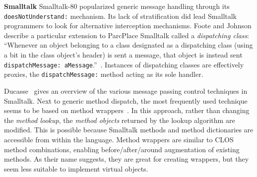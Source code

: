\documentclass{acm_proc_article-sp}
\begin{document}
\textbf{Smalltalk} Smalltalk-80 popularized generic message handling through its \texttt{doesNotUnderstand:} mechanism. Its lack of stratification did lead Smalltalk programmers to look for alternative interception mechanisms. Foote and Johnson describe a particular extension to ParcPlace Smalltalk called a \emph{dispatching class}: ``Whenever an object belonging to a class designated as a dispatching class (using a bit in the class object's header) is sent a message, that object is instead sent \texttt{dispatchMessage: aMessage}.''~\cite{foot_johnson_reflection_in_st80}. Instances of dispatching classes are effectively proxies, the \texttt{dispatchMessage:} method acting as its sole handler.

Ducasse~\cite{ducasse} gives an overview of the various message passing control techniques in Smalltalk. Next to generic method dispatch, the most frequently used technique seems to be based on method wrappers~\cite{brant}. In this approach, rather than changing the \emph{method lookup}, the \emph{method objects} returned by the lookup algorithm are modified. This is possible because Smalltalk methods and method dictionaries are accessible from within the language. Method wrappers are similar to CLOS method combinations, enabling before/after/around augmentation of existing methods. As their name suggests, they are great for creating wrappers, but they seem less suitable to implement virtual objects.
\end{document}
